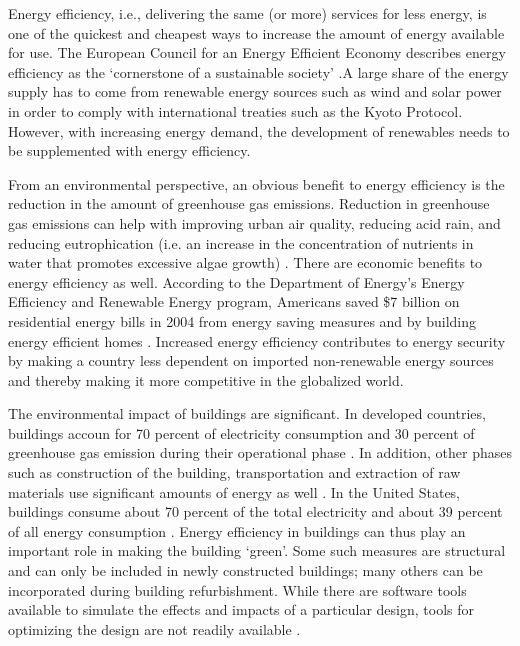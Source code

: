 Energy efficiency, i.e., delivering the same (or more) services for less energy, is one of the quickest and cheapest ways to increase the amount of energy available for use. The European Council for an Energy Efficient Economy describes energy efficiency  as the `cornerstone of a sustainable society' \cite{ecees}.A large share of the energy supply has to come from renewable energy sources such as wind and solar power in order to comply with international treaties such as the Kyoto Protocol. However, with increasing energy demand, the development of renewables needs to be supplemented with energy efficiency.

From an environmental perspective, an obvious benefit to energy efficiency is 
the reduction in the amount of greenhouse gas emissions. Reduction in greenhouse gas emissions can help with  improving urban air quality, reducing acid rain, and reducing eutrophication (i.e. an increase in the concentration of nutrients in water that promotes excessive algae growth) \cite{ecees}. There are economic benefits to energy efficiency as well. According to the Department of Energy's Energy Efficiency and Renewable Energy program, Americans saved \$7 billion on residential energy bills in 2004 from energy saving measures and by building energy efficient homes \cite{wri}. Increased energy efficiency contributes to energy security by making a country less dependent on imported non-renewable energy sources and thereby making it more competitive in the globalized world.

The environmental impact of buildings are significant. In developed countries, buildings accoun for 70 percent of electricity consumption and 30 percent of greenhouse gas emission during their operational phase \cite{Castro-Lacouture2009}. In addition, other phases such as construction of the building, transportation and extraction of raw materials use significant amounts of energy as well \cite{Castro-Lacouture2009}. In the United States, buildings consume about 70 percent of the total electricity and about 39 percent of all energy consumption \cite{Wang2005a}. Energy efficiency in buildings can thus play an important role in making the building `green'. Some such measures are structural and can only be included in newly constructed buildings; many others can be incorporated during building refurbishment. While there are software tools available to simulate the effects and impacts of a particular design, tools for optimizing the design are not readily available \cite{Wang2005b} \cite{Pernodet2009}.

